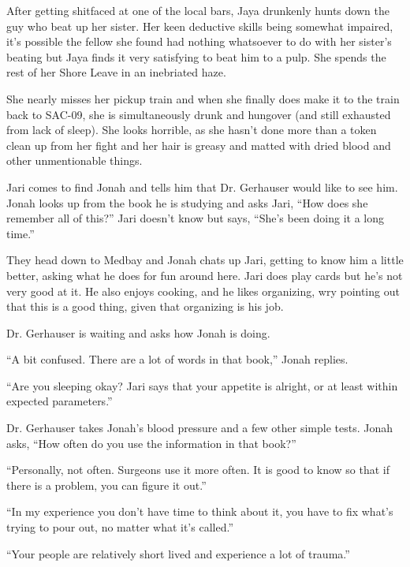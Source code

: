 After getting shitfaced at one of the local bars, Jaya drunkenly hunts down the guy who beat up her sister.  Her keen deductive skills being somewhat impaired, it's possible the fellow she found had nothing whatsoever to do with her sister's beating but Jaya finds it very satisfying to beat him to a pulp.  She spends the rest of her Shore Leave in an inebriated haze.



She nearly misses her pickup train and when she finally does make it to the train back to SAC-09, she is simultaneously drunk and hungover (and still exhausted from lack of sleep).  She looks horrible, as she hasn't done more than a token clean up from her fight and her hair is greasy and matted with dried blood and other unmentionable things.




Jari comes to find Jonah and tells him that Dr. Gerhauser would like to see him.  Jonah looks up from the book he is studying and asks Jari, ``How does she remember all of this?''  Jari doesn't know but says, ``She's been doing it a long time.''



They head down to Medbay and Jonah chats up Jari, getting to know him a little better, asking what he does for fun around here.  Jari does play cards but he's not very good at it.  He also enjoys cooking, and he likes organizing, wry pointing out that this is a good thing, given that organizing is his job.



Dr. Gerhauser is waiting and asks how Jonah is doing.  

``A bit confused.  There are a lot of words in that book,'' Jonah replies.

``Are you sleeping okay?  Jari says that your appetite is alright, or at least within expected parameters.''

Dr. Gerhauser takes Jonah's blood pressure and a few other simple tests.  Jonah asks, ``How often do you use the information in that book?''

``Personally, not often.  Surgeons use it more often.  It is good to know so that if there is a problem, you can figure it out.''

``In my experience you don't have time to think about it, you have to fix what's trying to pour out, no matter what it's called.''

``Your people are relatively short lived and experience a lot of trauma.''

